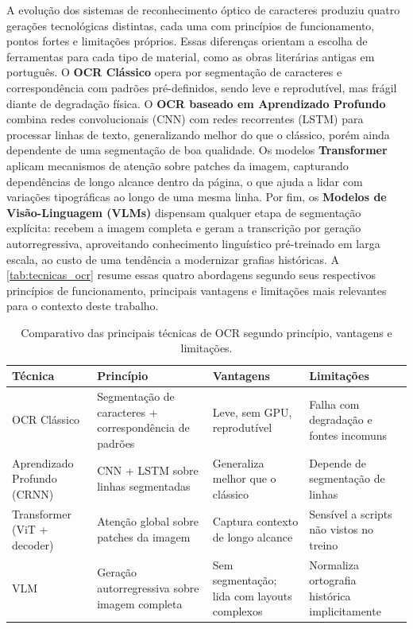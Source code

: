 \documentclass[noabntexcite,oneside]{ufsc-thesis-rn46-2019}
\begin{document}
A evolução dos sistemas de reconhecimento óptico de caracteres produziu quatro gerações
tecnológicas distintas, cada uma com princípios de funcionamento, pontos fortes e
limitações próprios. Essas diferenças orientam a escolha de ferramentas para cada tipo
de material, como as obras literárias antigas em português. O \textbf{OCR Clássico} opera por segmentação de caracteres e correspondência
com padrões pré-definidos, sendo leve e reprodutível, mas frágil diante de degradação
física. O \textbf{OCR baseado em Aprendizado Profundo} combina redes convolucionais
(CNN) com redes recorrentes (LSTM) para processar linhas de texto, generalizando melhor
do que o clássico, porém ainda dependente de uma segmentação de boa qualidade. Os modelos
\textbf{Transformer} aplicam mecanismos de atenção sobre patches da imagem, capturando
dependências de longo alcance dentro da página, o que ajuda a lidar com variações
tipográficas ao longo de uma mesma linha. Por fim, os \textbf{Modelos de Visão-Linguagem (VLMs)} dispensam qualquer
etapa de segmentação explícita: recebem a imagem completa e geram a transcrição por
geração autorregressiva, aproveitando conhecimento linguístico pré-treinado em larga
escala, ao custo de uma tendência a modernizar grafias históricas. A
\autoref{tab:tecnicas_ocr} resume essas quatro abordagens segundo seus respectivos princípios de
funcionamento, principais vantagens e limitações mais relevantes para o contexto deste trabalho.

\begin{table}[htb]
\centering
\caption{Comparativo das principais técnicas de OCR segundo princípio, vantagens e
limitações.}
\label{tab:tecnicas_ocr}
\renewcommand{\arraystretch}{1.3}
\begin{tabular}{L{2.2cm} L{4cm} L{3.5cm} L{3.5cm}}
\hline
\textbf{Técnica} & \textbf{Princípio} & \textbf{Vantagens} & \textbf{Limitações} \\
\hline
OCR Clássico &
  Segmentação de caracteres + correspondência de padrões &
  Leve, sem GPU, reprodutível &
  Falha com degradação e fontes incomuns \\ \hline
Aprendizado Profundo (CRNN) &
  CNN + LSTM sobre linhas segmentadas &
  Generaliza melhor que o clássico &
  Depende de segmentação de linhas \\ \hline
Transformer (ViT + decoder) &
  Atenção global sobre patches da imagem &
  Captura contexto de longo alcance &
  Sensível a scripts não vistos no treino \\ \hline
VLM &
  Geração autorregressiva sobre imagem completa &
  Sem segmentação; lida com layouts complexos &
  Normaliza ortografia histórica implicitamente \\
\hline
\end{tabular}
\end{table}
\end{document}
